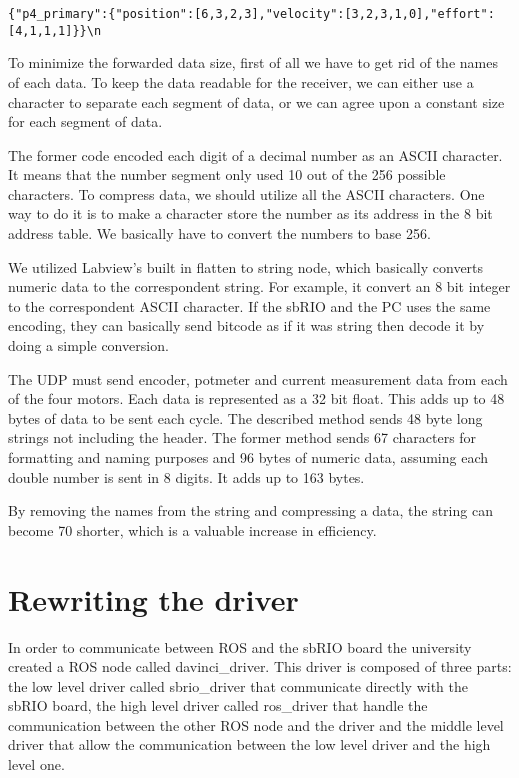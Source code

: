 \begin{verbatim}
{"p4_primary":{"position":[6,3,2,3],"velocity":[3,2,3,1,0],"effort":[4,1,1,1]}}\n
\end{verbatim}

To minimize the forwarded data size, first of all we have to get rid of the names of each data. To keep the data readable for the receiver, we can either use a character to separate each segment of data, or we can agree upon a constant size for each segment of data.

The former code encoded each digit of a decimal number as an ASCII character. It means that the number segment only used 10 out of the 256 possible characters. To compress data, we should utilize all the ASCII characters. One way to do it is to make a character store the number as its address in the 8 bit address table. We basically have to convert the numbers to base 256.

We utilized Labview's built in flatten to string node, which basically converts numeric data to the correspondent string. For example, it convert an 8 bit integer to the correspondent ASCII character. If the sbRIO and the PC uses the same encoding, they can basically send bitcode as if it was string then decode it by doing a simple conversion.  
 
The UDP must send encoder, potmeter and current measurement data from each of the four motors. Each data is represented as a 32 bit float. This adds up to 48 bytes of data to be sent each cycle. The described method sends 48 byte long strings not including the header. The former method sends 67 characters for formatting and naming purposes and 96 bytes of numeric data, assuming each double number is sent in 8 digits. It adds up to 163 bytes.

By removing the names from the string and compressing a data, the string can become 70 shorter, which is a valuable increase in efficiency.


\section{Rewriting the driver}

In order to communicate between ROS and the sbRIO board the university created a ROS node called davinci\_driver. This driver is composed of three parts: the low level driver called sbrio\_driver that communicate directly with the sbRIO board, the high level driver called ros\_driver that handle the communication between the other ROS node and the driver and the middle level driver that allow the communication between the low level driver and the high level one.

